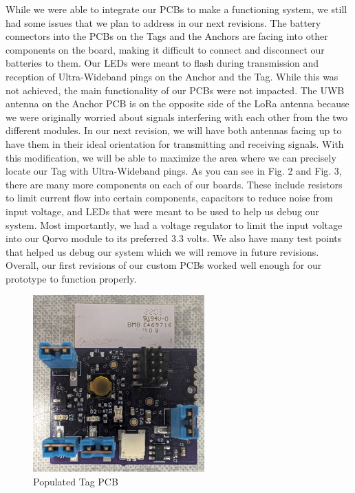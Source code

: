 \documentclass[conference]{IEEEtran}
\begin{document}
While we were able to integrate our PCBs to make a functioning system, we 
still had some issues that we plan to address in our next revisions. The 
battery connectors into the PCBs on the Tags and the Anchors are facing 
into other components on the board, making it difficult to connect and 
disconnect our batteries to them. Our LEDs were meant to flash during 
transmission and reception of Ultra-Wideband pings on the Anchor and the 
Tag. While this was not achieved, the main functionality of our PCBs were 
not impacted. The UWB antenna on the Anchor PCB is on the opposite side of 
the LoRa antenna because we were originally worried about signals interfering 
with each other from the two different modules. In our next revision, we will 
have both antennas facing up to have them in their ideal orientation for 
transmitting and receiving signals. With this modification, we will be able to 
maximize the area where we can precisely locate our Tag with Ultra-Wideband 
pings. As you can see in Fig. 2 and Fig. 3, there are many more components on 
each of our boards. These include resistors to limit current flow into certain 
components, capacitors to reduce noise from input voltage, and LEDs that were 
meant to be used to help us debug our system. Most importantly, we had a 
voltage regulator to limit the input voltage into our Qorvo module to its 
preferred 3.3 volts. We also have many test points that helped us debug our 
system which we will remove in future revisions. Overall, our first revisions 
of our custom PCBs worked well enough for our prototype to function properly.

\begin{figure}
\begin{center}
\includegraphics[scale=3]{mdr_tag_picture.png}
\caption{Populated Tag PCB}
\end{center}
\end{figure}
\end{document}
